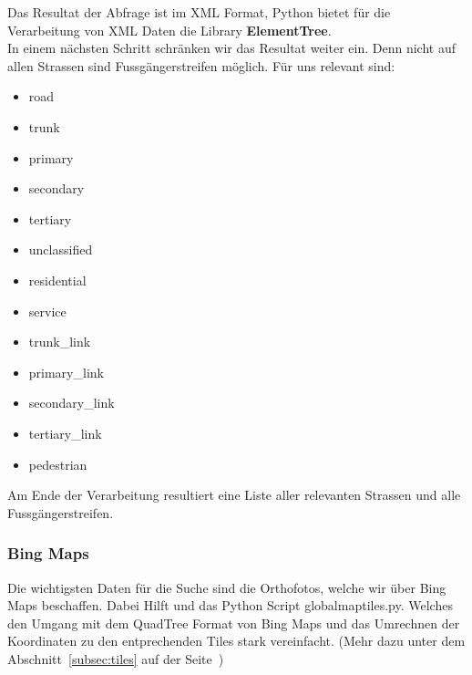 Das Resultat der Abfrage ist im XML Format, Python bietet für die Verarbeitung von XML Daten die Library \textbf{ElementTree}.\\
In einem nächsten Schritt schränken wir das Resultat weiter ein. Denn nicht auf allen Strassen sind Fussgängerstreifen möglich. Für uns relevant sind:
\begin{itemize}
	\item road
	\item trunk
	\item primary
	\item secondary 
	\item tertiary
	\item unclassified
	\item residential
	\item service 
	\item trunk\_link 
	\item primary\_link 
	\item secondary\_link 
	\item tertiary\_link 
	\item pedestrian
\end{itemize}

Am Ende der Verarbeitung resultiert eine Liste aller relevanten Strassen und alle Fussgängerstreifen.

\subsubsection{Bing Maps}
Die wichtigsten Daten für die Suche sind die Orthofotos, welche wir über Bing Maps beschaffen. Dabei Hilft und das Python Script globalmaptiles.py. Welches den Umgang mit dem QuadTree Format von Bing Maps und das Umrechnen der Koordinaten zu den entprechenden Tiles stark vereinfacht. (Mehr dazu unter dem Abschnitt~\ref{subsec:tiles} auf der Seite~\pageref{subsec:tiles})



